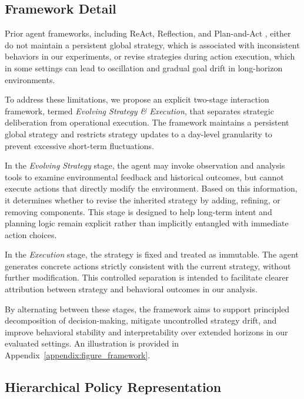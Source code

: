 \subsection{Framework Detail}
\label{sec:two_stage_framework}

Prior agent frameworks, including ReAct, Reflection, and Plan-and-Act \citep{2025planandact, yao2023react}, either do not maintain a persistent global strategy, which is associated with inconsistent behaviors in our experiments, or revise strategies during action execution, which in some settings can lead to oscillation and gradual goal drift in long-horizon environments.

To address these limitations, we propose an explicit two-stage interaction framework, termed \textit{Evolving Strategy \& Execution}, that separates strategic deliberation from operational execution. The framework maintains a persistent global strategy and restricts strategy updates to a day-level granularity to prevent excessive short-term fluctuations.

In the \textit{Evolving Strategy} stage, the agent may invoke observation and analysis tools to examine environmental feedback and historical outcomes, but cannot execute actions that directly modify the environment. Based on this information, it determines whether to revise the inherited strategy by adding, refining, or removing components. This stage is designed to help long-term intent and planning logic remain explicit rather than implicitly entangled with immediate action choices.

In the \textit{Execution} stage, the strategy is fixed and treated as immutable. The agent generates concrete actions strictly consistent with the current strategy, without further modification. This controlled separation is intended to facilitate clearer attribution between strategy and behavioral outcomes in our analysis.

By alternating between these stages, the framework aims to support principled decomposition of decision-making, mitigate uncontrolled strategy drift, and improve behavioral stability and interpretability over extended horizons in our evaluated settings. An illustration is provided in Appendix~\ref{appendix:figure_framework}.

\subsection{Hierarchical Policy Representation}
\label{sec:policy}

